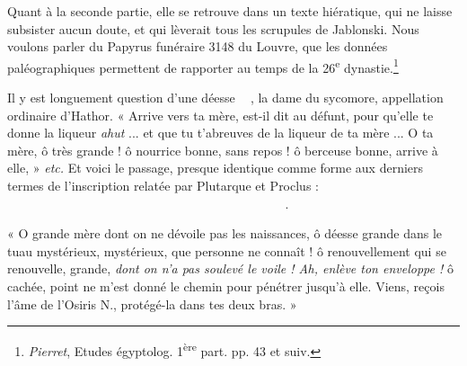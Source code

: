 \documentclass[a4paper, 11pt, oneside]{article}
\newcommand*\hieroAAAG{}
\newcommand*\hieroAAAH{}
\newcommand*\hieroAAAU{}
\newcommand*\hieroAABR{}
\newcommand*\hieroAACM{}
\newcommand*\hieroAACN{\raisebox{1ex}{}}
\newcommand*\hieroAACS{}
\newcommand*\hieroAACY{}
\newcommand*\hieroAADF{}
\newcommand*\hieroAADG{}
\newcommand*\hieroAADI{\raisebox{0.5ex}{}}
\newcommand*\hieroAADW{}
\newcommand*\hieroAAEB{}
\newcommand*\hieroAAEK{}
\newcommand*\hieroAAEN{}
\newcommand*\hieroAAEZ{}
\newcommand*\hieroAAFF{}
\newcommand*\hieroAAFS{}
\newcommand*\hieroAAFZ{\raisebox{0.5ex}{}}
\newcommand*\hieroAAHX{}
\newcommand*\hieroAAHY{}
\newcommand*\hieroAAHZ{}
\newcommand*\hieroAAII{}
\newcommand*\hieroAAIU{}
\newcommand*\hieroAAJZ{}
\newcommand*\hieroAAKO{}
\newcommand*\hieroAALM{}
\newcommand*\hieroAANC{}
\newcommand*\hieroAAND{\raisebox{0.5ex}{}}
\newcommand*\hieroAANR{}
\newcommand*\hieroAANT{\raisebox{0.5ex}{}}
\newcommand*\hieroAAOX{}
\newcommand*\hieroAARO{}
\newcommand*\hieroAATE{}
\newcommand*\hieroAAZP{}
\newcommand*\hieroAAZU{}
\newcommand*\hieroABHT{}
\newcommand*\hieroABHU{}
\newcommand*\hieroABHV{}
\newcommand*\hieroABHW{}
\newcommand*\hieroABHX{}
\newcommand*\hieroABHY{}
\newcommand*\hieroABHZ{}
\newcommand*\hieroABIA{}
\newcommand*\hieroABIB{}
\newcommand*\hieroABIC{}
\newcommand*\hieroABID{}
\newcommand*\hieroABIE{}
\newcommand*\hieroABIF{}
\newcommand*\hieroABIG{}
\newcommand*\hieroABIH{}
\newcommand*\hieroABII{}
\newcommand*\hieroABIJ{}
\newcommand*\hieroABIK{\raisebox{0.3ex}{}}
\newcommand*\hieroABIL{}
\newcommand*\hieroABIM{}
\newcommand*\hieroABIN{\raisebox{0.5ex}{}}
\newcommand*\hieroABIO{}
\newcommand*\hieroABIP{}
\begin{document}
Quant à la seconde partie, elle se retrouve dans un texte hiératique, qui ne laisse subsister aucun doute, et qui lèverait tous les scrupules de Jablonski. Nous voulons parler du Papyrus funéraire 3148 du Louvre, que les données paléographiques permettent de rapporter au temps de la 26\textsuperscript{e} dynastie.\footnote{\emph{Pierret}, Etudes égyptolog. 1\textsuperscript{ère} part. pp. 43 et suiv.}

Il y est longuement question d'une déesse $\hieroAAFS\:\hieroABHT\:\hieroAAAH\allowbreak\:\hieroAAAH\:\hieroAAAU$, la dame du sycomore, appellation ordinaire d'Hathor. « Arrive vers ta mère, est-il dit au défunt, pour qu'elle te donne la liqueur \emph{ahut} ... et que tu t'abreuves de la liqueur de ta mère ... O ta mère, ô très grande ! ô nourrice bonne, sans repos ! ô berceuse bonne, arrive à elle, » \emph{etc.} Et voici le passage, presque identique comme forme aux derniers termes de l'inscription relatée par Plutarque et Proclus : $\hieroAAAH\:\hieroAADF\:\hieroAAKO\allowbreak\:\hieroAAII\:\hieroAACY\:\hieroAANR\allowbreak\:\hieroAADW\:\hieroAACS\:\hieroABHU\allowbreak\:\hieroABHV\:\hieroAANC\:\hieroAACS\allowbreak\:\hieroABHW\:\hieroAACS\:\hieroAAAH\allowbreak\:\hieroAADF\:\hieroAAEK\:\hieroAAII\allowbreak\:\hieroABHX\:\hieroAABR\:\hieroAAIU\allowbreak\:\hieroAACN\:\hieroAANT\:\hieroAAAG\allowbreak\:\hieroAACM\:\hieroAAAU\:\hieroABHY\allowbreak\:\hieroABHZ\:\hieroAACY\:\hieroABIA\allowbreak\:\hieroABIB\:\hieroAAOX\:\hieroAARO\allowbreak\:\hieroAAJZ\:\hieroAACS\:\hieroAAAH\allowbreak\:\hieroAADF\:\hieroAAEK\:\hieroABIC\allowbreak\:\hieroAALM\:\hieroAATE\:\hieroAACY\allowbreak\:\hieroAAZP\:\hieroAADW\:\hieroAACS\allowbreak\:\hieroABHU\:\hieroABHV\:\hieroABID\allowbreak\:\hieroABIE\:\hieroAAAH\:\hieroAACS\allowbreak\:\hieroAAFZ\:\hieroAACS\:\hieroAAAH\allowbreak\:\hieroAADF\:\hieroAACS\:\hieroABHU\allowbreak\:\hieroABHV\:\hieroAAHX\:\hieroAAEZ\allowbreak\:\hieroAACM\:\hieroABIF\:\hieroAACS\allowbreak\:\hieroAAAH\:\hieroAADF\:\hieroAAZU\allowbreak\:\hieroAAAG\:\hieroAAHZ\:\hieroAAII\allowbreak\:\hieroAACY\:\hieroAADW\:\hieroABIG\allowbreak\:\hieroABID\:\hieroABIH\:\hieroAAEB\allowbreak\:\hieroAACN\:\hieroABII\:\hieroAAFF\allowbreak\:\hieroAADG\:\hieroAAEN\:\hieroABIJ\allowbreak\:\hieroABIK\:\hieroABIL\:\hieroABIM\allowbreak\:\hieroAACN\:\hieroAAHY\:\hieroAAND\allowbreak\:\hieroAAEK\:\hieroABIN\:\hieroAADI\allowbreak\:\hieroAACM\:\hieroAATE\:\hieroAACY\allowbreak\:\hieroAACS\:\hieroAABR\:\hieroAAIU\allowbreak\:\hieroAACN\:\hieroABIO\allowbreak\:\hieroABIP\:\hieroAACY$.

« O grande mère dont on ne dévoile pas les naissances, ô déesse grande dans le tuau mystérieux, mystérieux, que personne ne connaît ! ô renouvellement qui se renouvelle, grande, \emph{dont on n'a pas soulevé le voile ! Ah, enlève ton enveloppe !} ô cachée, point ne m'est donné le chemin pour pénétrer jusqu'à elle. Viens, reçois l'âme de l'Osiris N., protégé-la dans tes deux bras. »
\end{document}
